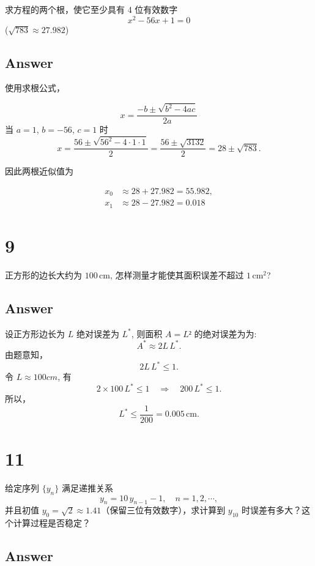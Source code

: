 \documentclass[11pt]{article}
\begin{document}
求方程的两个根，使它至少具有 4 位有效数字 \[
x^2 - 56x + 1 = 0
\] (\(\sqrt{783}\approx 27.982\))

\subsection{Answer}\label{answer}

使用求根公式，

\[
x = \frac{-b \pm \sqrt{b^2 - 4ac}}{2a}
\] 当 \(a=1\), \(b=-56\), \(c=1\) 时 \[
x = \frac{56 \pm \sqrt{56^2 - 4\cdot1\cdot1}}{2} = \frac{56 \pm \sqrt{3132}}{2} = 28 \pm \sqrt{783}.
\]

因此两根近似值为

\[
\boxed{
\begin{aligned}
x_0 &\approx 28 + 27.982 = 55.982,\\
x_1 &\approx 28 - 27.982=0.018
\end{aligned}
}
\]

    \section{9}\label{section}

正方形的边长大约为 \(100\,\mathrm{cm}\), 怎样测量才能使其面积误差不超过
\(1\,\mathrm{cm}^2\)?

\subsection{Answer}\label{answer}

设正方形边长为 \(L\) 绝对误差为 \(L^*\), 则面积 \(A = L²\)
的绝对误差为为: \[
A^* \approx 2L\,L^*.
\] 由题意知， \[
2L\,L^* \leq 1.
\] 令 \(L ≈ 100 cm\), 有 \[
2 \times 100\, L^* \leq 1 \quad \Longrightarrow \quad 200\,L^* \leq 1.
\] 所以， \[
\boxed{
L^* \leq \frac{1}{200} = 0.005\,\mathrm{cm}.
}
\]

    \section{11}\label{section}

给定序列 \(\{y_n\}\) 满足递推关系 \[
y_n = 10\,y_{n-1} - 1,\quad n = 1,2,\cdots,
\] 并且初值
\(y_0 = \sqrt{2} \approx 1.41\)（保留三位有效数字），求计算到 \(y_{10}\)
时误差有多大？这个计算过程是否稳定？

\subsection{Answer}\label{answer}
\end{document}
